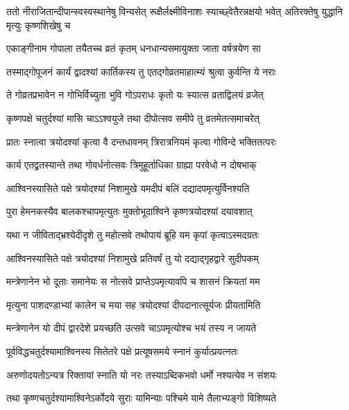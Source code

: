 \threelineshloka
{ततो नीराजितान्दीपान्स्वस्वस्थानेषु विन्यसेत्}
{रूक्षैर्लक्ष्मीविनाशः स्याच्छ्वेतैरन्नक्षयो भवेत्}
{अतिरक्तेषु युद्धानि मृत्युः कृष्णशिखेषु च} %

\twolineshloka
{एकाङ्गीनाम गोपाला तयैतच्च व्रतं कृतम्}
{धनधान्यसमायुक्ता जाता वर्षत्रयेण सा} %

\twolineshloka
{तस्माद्गोपूजनं कार्यं द्वादश्यां कार्तिकस्य तु}
{एतद्गोव्रतमाहात्म्यं श्रुत्वा कुर्वन्ति ये नराः} %

\twolineshloka
{ते गोव्रतप्रभावेन न गोभिर्विच्युता भुवि}
{गोऽपराधः कृतो यः स्यात्स व्रताद्विलयं व्रजेत्} %


\twolineshloka
{कृष्णपक्षे चतुर्दश्यां मासि चाऽऽश्वयुजे तथा}
{दीपोत्सव समीपे तु व्रतमेतत्समाचरेत्} %

\twolineshloka
{प्रातः स्नात्वा त्रयोदश्यां कृत्वा वै दन्तधावनम्}
{त्रिरात्रनियमं कृत्वा गोविन्दे भक्तितत्परः} %

\twolineshloka
{कार्य एतद्व्रतस्यान्ते तथा गोवर्धनोत्सवः}
{त्रिमुहूर्ताधिका ग्राह्या परवेधो न दोषभाक्} %

\twolineshloka
{आश्विनस्यासिते पक्षे त्रयोदश्यां निशामुखे}
{यमदीपं बलिं दद्यादपमृत्युर्विनश्यति} %

\twolineshloka
{पुरा हेमनकस्यैव बालकश्चापमृत्युतः}
{मुक्तोभूदाश्विने कृष्णत्रयोदश्यां दयावशात्} %

\twolineshloka
{यथा न जीविताद्भ्रश्येदीदृशे तु महोत्सवे}
{तथोपायं ब्रूहि यम कृपां कृत्वाऽस्मदग्रतः} %


\twolineshloka
{आश्विनस्यासिते पक्षे त्रयोदश्यां निशामुखे}
{प्रतिवर्षं तु यो दद्याद्गृहद्वारे सुदीपकम्} %

\twolineshloka
{मन्त्रेणानेन भो दूताः समानेयः स नोत्सवे}
{प्राप्तेऽपमृत्यावपि च शासनं क्रियतां मम} %

\twolineshloka
{मृत्युना पाशदण्डाभ्यां कालेन च मया सह}
{त्रयोदश्यां दीपदानात्सूर्यजः प्रीयतामिति} %

\twolineshloka
{मन्त्रेणानेन यो दीपं द्वारदेशे प्रयच्छति}
{उत्सवे चाऽपमृत्योश्च भयं तस्य न जायते} %


\twolineshloka
{पूर्वविद्धचतुर्दश्यामाश्विनस्य सितेतरे}
{पक्षे प्रत्यूषसमये स्नानं कुर्यात्प्रयत्नतः} %

\twolineshloka
{अरुणोदयतोऽन्यत्र रिक्तायां स्नाति यो नरः}
{तस्याऽब्दिकभवो धर्मो नश्यत्येव न संशयः} %

\twolineshloka
{तथा कृष्णचतुर्दश्यामाश्विनेऽर्कोदये सुराः}
{यामिन्याः पश्चिमे यामे तैलाभ्यङ्गो विशिष्यते} %

